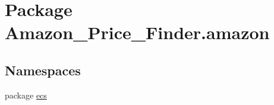 \hypertarget{namespace_amazon___price___finder_1_1amazon}{\section{Package Amazon\-\_\-\-Price\-\_\-\-Finder.\-amazon}
\label{namespace_amazon___price___finder_1_1amazon}
}
\subsection*{Namespaces}
\begin{DoxyCompactItemize}
\item 
package \hyperlink{namespace_amazon___price___finder_1_1amazon_1_1ecs}{ecs}
\end{DoxyCompactItemize}
